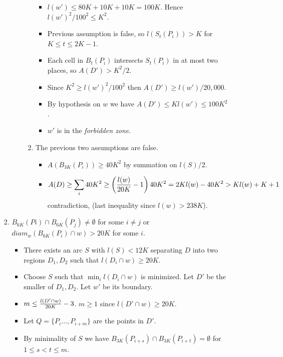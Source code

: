 \documentclass[11pt]{article} \usepackage{amssymb}
\begin{document}
\begin{enumerate}
\begin{itemize}
\begin{enumerate}
\begin{itemize}
\begin{enumerate}
            \begin{itemize}
            \item $l(w')\leq 80K+10K+10K=100K$. Hence  $l(w')^2/100^2 \leq K^2$.
            \item Previous assumption is false, so $l(S_t(P_i))>K$ for 
              $K \leq t \leq 2K -1$.
            \item Each cell in $B_t(P_i)$ intersects $S_t(P_i)$ in at most
              two places, so $A(D')>K^2/2$.
            \item Since $K^2\geq l(w')^2/100^2$ then $A(D') \geq l(w')/20,000$.
            \item By hypothesis on $w$ we have $A(D') \leq Kl(w') \leq 100K^2$.
            \item $w'$ is in the {\em forbidden zone}.
            \end{itemize}
          \item The previous two assumptions are false.
            \begin{itemize}
            \item $A(B_{3K}(P_i)) \geq 40K^2$ by summation on $l(S)/2$.
            \item 
              $$A(D)\geq \sum_i 40K^2\geq \left({l(w)\over 20K}-1\right)40K^2=2Kl(w)-40K^2>Kl(w)+K+1$$
              contradiction, (last inequality since $l(w)>238K$).
            \end{itemize}
          \end{enumerate}
        \end{itemize}
      \item $B_{6K}(Pi)\cap B_{6K}(P_j)\neq\emptyset$ for some 
        $i\neq j$  or $diam_w(B_{6K}(P_i)\cap w) > 20K$ for some $i$.
        \begin{itemize}
        \item There exists an arc $S$ with $l(S)<12K$ separating $D$ 
          into two regions $D_1,D_2$ such that $l(D_i\cap w) \geq 20K$.
        \item Choose $S$ such that $\min_il(D_i\cap w)$ is minimized. Let $D'$ 
          be the smaller of $D_1,D_2$. Let $w'$ be its boundary.
        \item $m\leq {l(D'\cap w)\over 20K}-3$. $m\geq 1$ since 
          $l(D'\cap w) \geq 20K$.
        \item Let $Q=\{P_i\ldots, P_{i+m}\}$ are the points in $D'$.
        \item By minimality of $S$ we have 
          $B_{3K}(P_{i+s})\cap B_{3K}(P_{i+t})=\emptyset$ for $1\leq s < t \leq m$.

\end{itemize}
\end{enumerate}
\end{itemize}
\end{enumerate}
\end{document}
